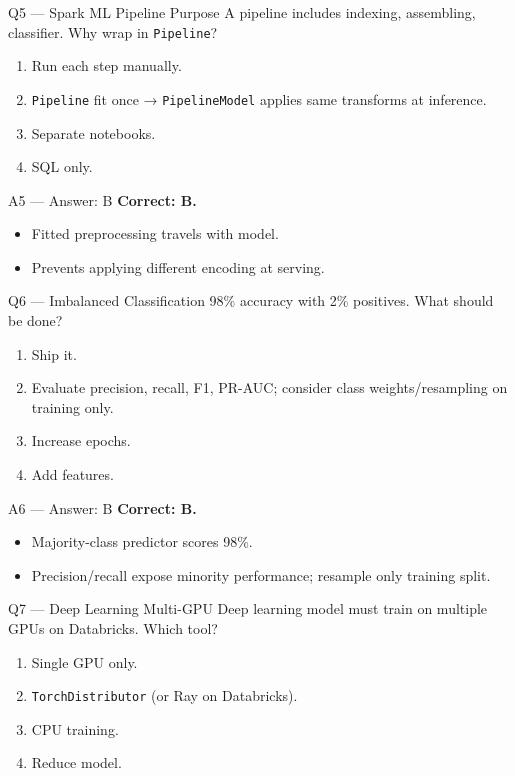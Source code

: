 \documentclass[aspectratio=169,9pt]{beamer}
\begin{document}
	\begin{frame}{Q5 — Spark ML Pipeline Purpose}
		A pipeline includes indexing, assembling, classifier. Why wrap in \texttt{Pipeline}?
		\begin{enumerate}[label=\Alph*.]
			\item Run each step manually.
			\item \texttt{Pipeline} fit once → \texttt{PipelineModel} applies same transforms at inference.
			\item Separate notebooks.
			\item SQL only.
		\end{enumerate}
	\end{frame}
	
	\begin{frame}{A5 — Answer: B}
		\textbf{Correct: B.}
		\begin{itemize}
			\item Fitted preprocessing travels with model.
			\item Prevents applying different encoding at serving.
		\end{itemize}
	\end{frame}
	
	\begin{frame}{Q6 — Imbalanced Classification}
		98\% accuracy with 2\% positives. What should be done?
		\begin{enumerate}[label=\Alph*.]
			\item Ship it.
			\item Evaluate precision, recall, F1, PR-AUC; consider class weights/resampling on training only.
			\item Increase epochs.
			\item Add features.
		\end{enumerate}
	\end{frame}
	
	\begin{frame}{A6 — Answer: B}
		\textbf{Correct: B.}
		\begin{itemize}
			\item Majority-class predictor scores 98\%.
			\item Precision/recall expose minority performance; resample only training split.
		\end{itemize}
	\end{frame}
	
	\begin{frame}{Q7 — Deep Learning Multi-GPU}
		Deep learning model must train on multiple GPUs on Databricks. Which tool?
		\begin{enumerate}[label=\Alph*.]
			\item Single GPU only.
			\item \texttt{TorchDistributor} (or Ray on Databricks).
			\item CPU training.
			\item Reduce model.
		\end{enumerate}
	\end{frame}
	
\end{document}
